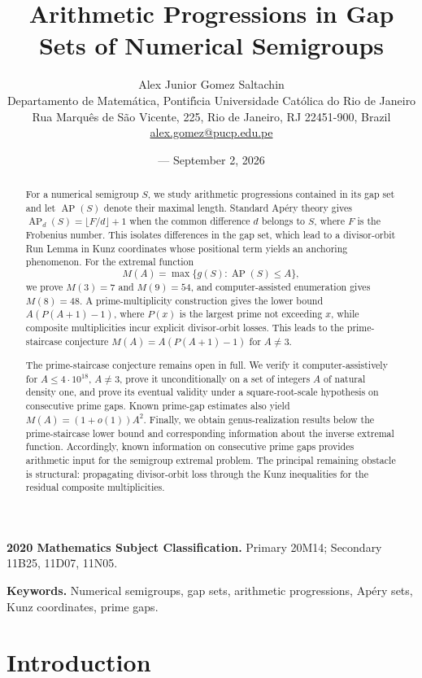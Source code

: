 \documentclass[11pt]{article}
\title{Arithmetic Progressions in Gap Sets of Numerical Semigroups}
\author{Alex Junior Gomez Saltachin\\[0.5em]
\small Departamento de Matem\'atica, Pontif\'{\i}cia Universidade Cat\'olica do Rio de Janeiro\\
\small Rua Marqu\^es de S\~ao Vicente, 225, Rio de Janeiro, RJ 22451-900, Brazil\\
\small \href{mailto:alex.gomez@pucp.edu.pe}{alex.gomez@pucp.edu.pe}}
\date{\small\draftstamp{} --- September 2, 2026}
\theoremstyle{plain}
\theoremstyle{definition}
\theoremstyle{remark}
\newcommand{\AP}{\operatorname{AP}}
\begin{document}
\maketitle

\begin{abstract}
For a numerical semigroup $S$, we study arithmetic progressions contained
in its gap set and let $\AP(S)$ denote their maximal length.  Standard
Ap\'ery theory gives $\AP_d(S)=\lfloor F/d\rfloor+1$ when the common
difference $d$ belongs to $S$, where $F$ is the Frobenius number.  This
isolates differences in the gap set, which lead to a divisor-orbit Run Lemma
in Kunz coordinates whose positional term yields an anchoring phenomenon.  For
the extremal function
\[
  M(A)=\max\{g(S):\AP(S)\leq A\},
\]
we prove $M(3)=7$ and $M(9)=54$, and computer-assisted enumeration gives
$M(8)=48$.  A prime-multiplicity construction gives the lower bound
$A(P(A+1)-1)$, where $P(x)$ is the largest prime not exceeding $x$, while
composite multiplicities incur explicit divisor-orbit losses.  This leads to
the prime-staircase conjecture
$M(A)=A(P(A+1)-1)$ for $A\neq3$.

The prime-staircase conjecture remains open in full.  We verify it
computer-assistively for $A\leq4\cdot10^{18}$, $A\neq3$, prove it
unconditionally on a set of integers $A$ of natural density one, and prove
its eventual validity under a square-root-scale hypothesis on consecutive
prime gaps.  Known prime-gap estimates also yield
$M(A)=(1+o(1))A^2$.  Finally, we obtain genus-realization results below the
prime-staircase lower bound and corresponding information about the inverse
extremal function.  Accordingly, known information on consecutive prime gaps
provides arithmetic input for the semigroup extremal problem.  The principal
remaining obstacle is structural: propagating divisor-orbit loss through the
Kunz inequalities for the residual composite multiplicities.
\end{abstract}

\medskip
\noindent\textbf{2020 Mathematics Subject Classification.}
Primary 20M14; Secondary 11B25, 11D07, 11N05.

\smallskip
\noindent\textbf{Keywords.}
Numerical semigroups, gap sets, arithmetic progressions, Ap\'ery sets,
Kunz coordinates, prime gaps.

\section{Introduction}\label{sec:introduction}
\end{document}
